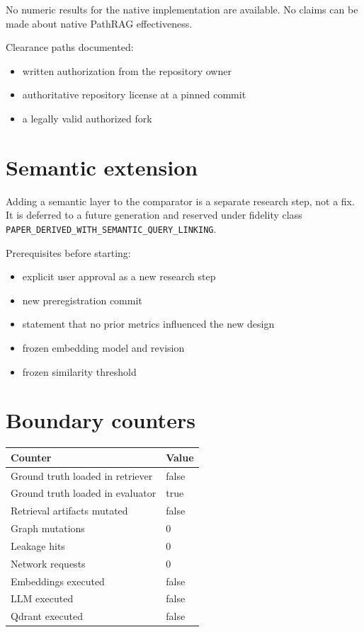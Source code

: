 \documentclass[11pt,a4paper]{article}
\begin{document}
No numeric results for the native implementation are
available. No claims can be made about native PathRAG
effectiveness.

Clearance paths documented:

\begin{itemize}[leftmargin=*]
    \item written authorization from the repository owner
    \item authoritative repository license at a pinned commit
    \item a legally valid authorized fork
\end{itemize}

\section{Semantic extension}

Adding a semantic layer to the comparator is a separate
research step, not a fix. It is deferred to a future
generation and reserved under fidelity class
\texttt{PAPER\_DERIVED\_WITH\_SEMANTIC\_QUERY\_LINKING}.

Prerequisites before starting:

\begin{itemize}[leftmargin=*]
    \item explicit user approval as a new research step
    \item new preregistration commit
    \item statement that no prior metrics influenced the new design
    \item frozen embedding model and revision
    \item frozen similarity threshold
\end{itemize}

\section{Boundary counters}

\begin{tabular}{ll}
\toprule
Counter & Value \\ \midrule
Ground truth loaded in retriever & false \\
Ground truth loaded in evaluator & true \\
Retrieval artifacts mutated & false \\
Graph mutations & 0 \\
Leakage hits & 0 \\
Network requests & 0 \\
Embeddings executed & false \\
LLM executed & false \\
Qdrant executed & false \\
\bottomrule
\end{tabular}
\end{document}
